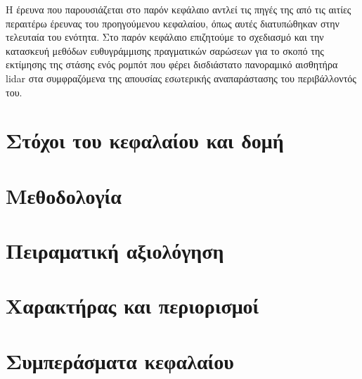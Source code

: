 Η έρευνα που παρουσιάζεται στο παρόν κεφάλαιο αντλεί τις πηγές της από τις
αιτίες περαιτέρω έρευνας του προηγούμενου κεφαλαίου, όπως αυτές διατυπώθηκαν
στην τελευταία του ενότητα. Στο παρόν κεφάλαιο επιζητούμε το σχεδιασμό και την
κατασκευή μεθόδων ευθυγράμμισης πραγματικών σαρώσεων για το σκοπό της εκτίμησης
της στάσης ενός ρομπότ που φέρει δισδιάστατο πανοραμικό αισθητήρα lidar στα
συμφραζόμενα της απουσίας εσωτερικής αναπαράστασης του περιβάλλοντός του.

\section{Στόχοι του κεφαλαίου και δομή}
  \label{section:02_05_01}
  

\section{Μεθοδολογία}
  \label{section:02_05_02}
  

\section{Πειραματική αξιολόγηση}
  \label{section:02_05_03}
  

\section{Χαρακτήρας και περιορισμοί}
  \label{section:02_05_04}
  

\section{Συμπεράσματα κεφαλαίου}
  \label{section:02_05_05}
  
